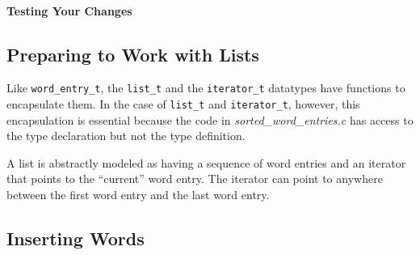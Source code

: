     \paragraph{Testing Your Changes}

        \begin{description}
        \end{description}


\subsection{Preparing to Work with Lists}

    Like \lstinline{word_entry_t}, the \lstinline{list_t} and the \lstinline{iterator_t} datatypes have functions to encapsulate them.
    In the case of \lstinline{list_t} and \lstinline{iterator_t}, however, this encapsulation is essential because the code in \textit{sorted\_word\_entries.c} has access to the type declaration but not the type definition.

    \begin{description}
    \end{description}

    A list is abstractly modeled as having a sequence of word entries and an iterator that points to the ``current'' word entry.
    The iterator can point to anywhere between the first word entry and the last word entry.

    \begin{description}
    \end{description}


\subsection{Inserting Words}


